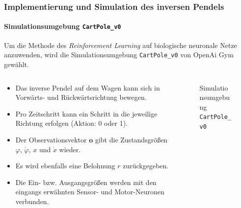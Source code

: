 \documentclass[10pt,t,aspectratio=1610]{beamer}
\newcommand{\ChapterCartpole}{Implementierung und Simulation des inversen Pendels}
\begin{document}
\begin{frame}
	\frametitle{\ChapterCartpole}
	\framesubtitle{Simulationsumgebung \texttt{CartPole\_v0}}
	\vspace{0.3cm}
	Um die Methode des \textit{Reinforcement Learning} auf biologische neuronale Netze anzuwenden, wird die Simulationsumgebung \texttt{CartPole\_v0} von OpenAi Gym gewählt.
	\vspace{0.1cm}
	\begin{columns}[T,onlytextwidth]
		\begin{column}{0.53\textwidth}
			\begin{itemize}
				\item Das inverse Pendel auf dem Wagen kann sich in Vorwärts- und Rückwärtsrichtung bewegen.
				\item Pro Zeitschritt kann ein Schritt in die jeweilige Richtung erfolgen (Aktion: 0 oder 1).
				\item Der Observationsvektor $\boldsymbol{o}$ gibt die Zustandsgrößen $\varphi$, $\dot{\varphi}$, $x$ und $\dot{x}$ wieder.
				\item Es wird ebenfalls eine Belohnung $r$ zurückgegeben.
				\item Die Ein- bzw. Ausgangsgrößen werden mit den eingangs erwähnten Sensor- und Motor-Neuronen verbunden.
			\end{itemize}
		\end{column}
		\hspace{-0.5cm}
		\begin{column}{0.45\textwidth}
			\vspace{-0.6cm}
			\begin{figure}[H] %
				\centering
				\scriptsize
				\def\svgwidth{6.5cm}
				
				\caption{Simulationsumgebung \texttt{CartPole\_v0}}
				\label{fig:cartpole}
			\end{figure}
		\end{column}
	\end{columns}
\end{frame}

\end{document}
